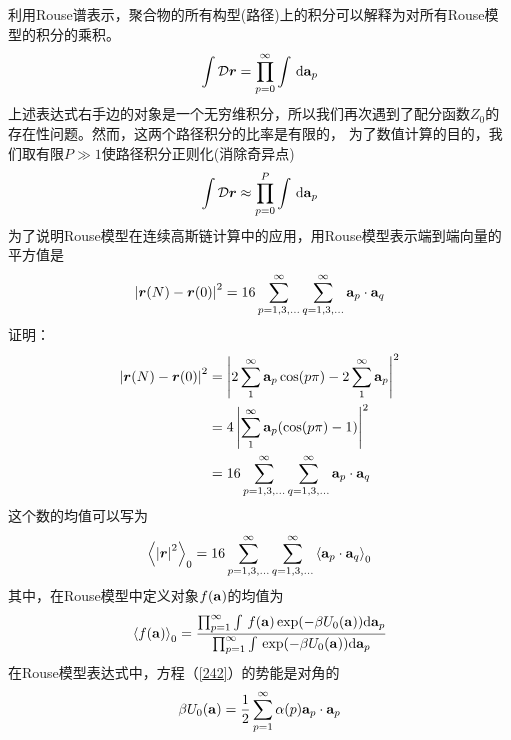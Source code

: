 利用Rouse谱表示，聚合物的所有构型(路径)上的积分可以解释为对所有Rouse模型的积分的乘积。
\begin{equation}\label{250}
\int \mathcal{D} \bm{r} = \prod_{p=0}^{\infty} \int \, \mathrm{d} \mathbf{a} _p
\end{equation}
上述表达式右手边的对象是一个无穷维积分，所以我们再次遇到了配分函数$Z_0$的存在性问题。然而，这两个路径积分的比率是有限的，
为了数值计算的目的，我们取有限$P\gg1$使路径积分正则化(消除奇异点)
\begin{equation}\label{251}
\int \mathcal{D} \bm{r} \approx \prod_{p=0}^{P} \int \, \mathrm{d} \mathbf{a} _p\end{equation}
为了说明Rouse模型在连续高斯链计算中的应用，用Rouse模型表示端到端向量的平方值是
\begin{equation}\label{252}
\left | \bm{r} (N)-\bm{r} (0) \right |^2=16\sum_{p=1,3,...}^{\infty}\sum_{q=1,3,...}^{\infty} \mathbf{a} _p \cdot \mathbf{a} _q
\end{equation}
证明：
\begin{equation*}
\begin{aligned}
\left | \bm{r} (N)-\bm{r} (0) \right |^2 & =\left | 2\sum_{1}^{\infty}\mathbf{a} _p\cos (p\pi)-2\sum_{1}^{\infty}\mathbf{a} _p \right |^2\\ & =4\left | \sum_{1}^{\infty}\mathbf{a} _p(\cos(p\pi)-1) \right |^2 \\ & =16\sum_{p=1,3,...}^{\infty}\sum_{q=1,3,...}^{\infty} \mathbf{a} _p \cdot \mathbf{a} _q\\
\end{aligned}
\end{equation*}
这个数的均值可以写为
\begin{equation}\label{253}
\left \langle \left| \bm{r}  \right|^2 \right \rangle _0=16\sum_{p=1,3,...}^{\infty}\sum_{q=1,3,...}^{\infty} \left \langle \mathbf{a} _p \cdot \mathbf{a} _q \right \rangle _0 
\end{equation}
其中，在Rouse模型中定义对象$f(\mathbf{a} )$的均值为
\begin{equation}\label{254}
\left \langle f(\mathbf{a} ) \right \rangle _0=\frac{\begin{matrix} \prod_{p=1}^{\infty} \int \,f(\mathbf{a} )\exp(-\beta U_0(\mathbf{a} )) \mathrm{d} \mathbf{a} _p  \end{matrix}}{\begin{matrix} \prod_{p=1}^{\infty} \int \,\exp(-\beta U_0(\mathbf{a} )) \mathrm{d} \mathbf{a} _p  \end{matrix}}
\end{equation}
在Rouse模型表达式中，方程（\ref{242}）的势能是对角的
\begin{equation}\label{255}
\beta U_0(\mathbf{a} )=\frac{1}{2}\sum_{p=1}^{\infty}\alpha (p)\mathbf{a} _p \cdot \mathbf{a} _p
\end{equation}
